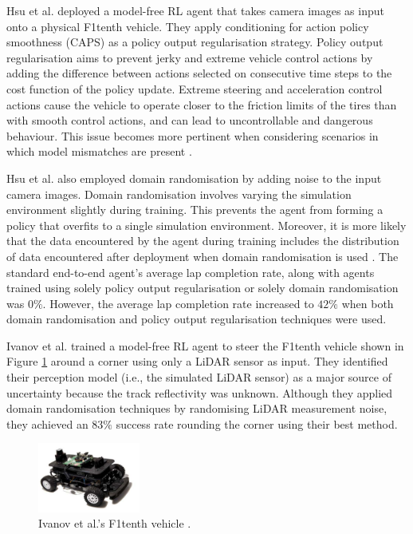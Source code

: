 Hsu et al. \cite{hsu2022} deployed a model-free RL agent that takes camera images as input onto a physical F1tenth vehicle.
They apply conditioning for action policy smoothness (CAPS) \cite{Caps2021} as a policy output regularisation strategy.
Policy output regularisation aims to prevent  jerky and extreme vehicle control actions by adding the difference between actions selected on consecutive time steps to the cost function of the policy update.
Extreme steering and acceleration control actions cause the vehicle to operate closer to the friction limits of the tires than with smooth control actions, and can lead to uncontrollable and dangerous behaviour.
This issue becomes more pertinent when considering scenarios in which model mismatches are present \cite{Chisari2021}.

Hsu et al. \cite{hsu2022} also employed domain randomisation by adding noise to the input camera images.
Domain randomisation involves varying the simulation environment slightly during training.
This prevents the agent from forming a policy that overfits to a single simulation environment.
Moreover, it is more likely that the data encountered by the agent during training includes the distribution of data encountered after deployment when domain randomisation is used \cite{Zhou2020}.
The standard end-to-end agent's average lap completion rate, along with agents trained using solely policy output regularisation or solely domain randomisation was $0\%$. 
However, the average lap completion rate increased to $42\%$ when both domain randomisation and policy output regularisation techniques were used.

Ivanov et al. \cite{Ivanov2020} trained a model-free RL agent to steer the F1tenth  vehicle  shown in Figure \ref{fig:ivanov} around a corner using only a LiDAR sensor as input.
They identified their perception model (i.e., the simulated LiDAR sensor) as a major source of uncertainty because the track reflectivity was unknown.
Although they applied domain randomisation techniques by randomising LiDAR measurement noise, they achieved an $83\%$ success rate rounding the corner using their best method.

\begin{figure}[htb!]
    \centering
    \includegraphics[width=0.3\textwidth]{contents/chapt2/figs/ivanov.PNG}
    \caption[Ivanov's F1tenth vehicle]{Ivanov et al.'s F1tenth vehicle \cite{Ivanov2020}.}
    \label{fig:ivanov}
\end{figure}



